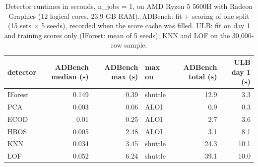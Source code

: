 \begin{table}[t]
\centering
\small
\setlength{\tabcolsep}{5pt}
\caption{Detector runtimes in seconds, n\_jobs = 1, on AMD Ryzen 5 5600H with Radeon Graphics (12 logical cores, 23.9 GB RAM). ADBench: fit + scoring of one split (15 sets $\times$ 5 seeds), recorded when the score cache was filled. ULB: fit on day 1 and training scores only (IForest: mean of 5 seeds); KNN and LOF on the 30,000-row sample.}
\label{tab:setup-runtimes}
\begin{tabular}{lrrlrr}
\toprule
detector & ADBench median (s) & ADBench max (s) & max on & ADBench total (s) & ULB day 1 (s) \\
\midrule
IForest & 0.149 & 0.39 & shuttle & 12.9 & 3.3 \\
PCA & 0.003 & 0.06 & ALOI & 0.9 & 0.3 \\
ECOD & 0.01 & 0.25 & ALOI & 2.7 & 3.6 \\
HBOS & 0.005 & 2.48 & ALOI & 3.1 & 8.1 \\
KNN & 0.034 & 3.45 & shuttle & 24.3 & 10.1 \\
LOF & 0.052 & 6.24 & shuttle & 39.1 & 10.0 \\
\bottomrule
\end{tabular}
\end{table}
